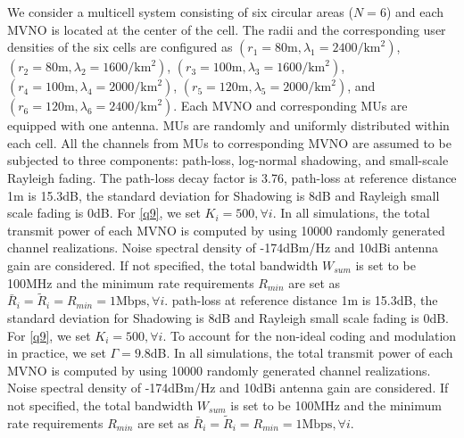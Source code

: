 \documentclass[journal]{IEEEtran}
\begin{document}
\begin{IEEEkeywords}
We consider a multicell system consisting of six circular areas ($N = 6$) and each MVNO is located at the center of the cell. The radii and the corresponding user densities of the six cells are configured as $(r_1 = 80\mbox{m}, \lambda_1 = 2400/\mbox{km}^2)$, $(r_2 = 80\mbox{m}, \lambda_2 = 1600/\mbox{km}^2)$, $(r_3 = 100\mbox{m}, \lambda_3 = 1600/\mbox{km}^2)$, $(r_4 = 100\mbox{m}, \lambda_4 = 2000/\mbox{km}^2)$, $(r_5 = 120\mbox{m}, \lambda_5 = 2000/\mbox{km}^2)$, and $(r_6 = 120\mbox{m}, \lambda_6 = 2400/\mbox{km}^2)$. Each MVNO and corresponding MUs are equipped with one antenna. MUs are randomly and uniformly distributed within each cell. All the channels from MUs to corresponding MVNO are assumed to be subjected to three components: path-loss, log-normal shadowing, and small-scale Rayleigh fading. The path-loss decay factor is 3.76, 
path-loss at reference distance 1m is 15.3dB, the standard deviation for Shadowing is 8dB and Rayleigh small scale fading is 0dB. For \eqref{q9}, we set $K_i = 500, \forall i$. In all simulations, the total transmit power of each MVNO is computed by using 10000 randomly generated channel realizations. Noise spectral density of -174dBm/Hz and 10dBi antenna gain are considered. If not specified, the total bandwidth $W_{sum}$ is set to be 100MHz and the minimum rate requirements $R_{min}$ are set as $\bar{R}_i = \tilde{R}_i = R_{min} = 1\mbox{Mbps}, \forall i$.
path-loss at reference distance 1m is 15.3dB, the standard deviation for Shadowing is 8dB and Rayleigh small scale fading is 0dB. For \eqref{q9}, we set $K_i = 500, \forall i$. To account for the non-ideal coding and modulation in practice, we set $\Gamma = 9.8$dB. In all simulations, the total transmit power of each MVNO is computed by using 10000 randomly generated channel realizations. Noise spectral density of -174dBm/Hz and 10dBi antenna gain are considered. If not specified, the total bandwidth $W_{sum}$ is set to be 100MHz and the minimum rate requirements $R_{min}$ are set as $\bar{R}_i = \tilde{R}_i = R_{min} = 1\mbox{Mbps}, \forall i$.


\end{IEEEkeywords}
\end{document}
